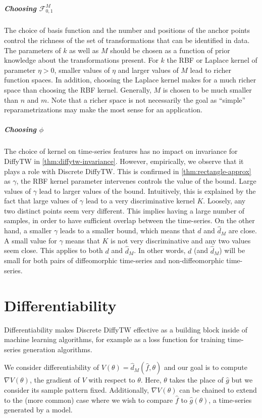 \subparagraph{Choosing $\mathcal F_{0,1}^M$} The choice of basis function and the number and positions of the anchor points control the richness of the set of transformations that can be identified in data. The parameters of $k$ as well as $M$ should be chosen as a function of prior knowledge about the transformations present. For $k$ the RBF or Laplace kernel of parameter $\eta>0$, smaller values of $\eta$ and larger values of $M$ lead to richer function spaces. In addition, choosing the Laplace kernel makes for a much richer space than choosing the RBF kernel\cite{shawe-taylor}. Generally, $M$ is chosen to be much smaller than $n$ and $m$. Note that a richer space is not necessarily the goal as ``simple'' reparametrizations may make the most sense for an application.

\subparagraph{Choosing $\phi$} The choice of kernel on time-series features has no impact on invariance for DiffyTW in \cref{thm:diffytw-invariance}. However, empirically, we observe that it plays a role with Discrete DiffyTW. This is confirmed in \cref{thm:rectangle-approx} as $\gamma$, the RBF kernel parameter intervenes controls the value of the bound. Large values of $\gamma$ lead to larger values of the bound. Intuitively, this is explained by the fact that large values of $\gamma$ lead to a very discriminative kernel $K$. Loosely, any two distinct points seem very different. This implies having a large number of samples, in order to have sufficient overlap between the time-series. On the other hand, a smaller $\gamma$ leads to a smaller bound, which means that $d$ and $\hat d_M$ are close. A small value for $\gamma$ means that $K$ is not very discriminative and any two values seem close. This applies to both $d$ and $\hat d_M$. In other words, $d$ (and $\hat d_M$) will be small for both pairs of diffeomorphic time-series and non-diffeomorphic time-series.

\section{Differentiability}
Differentiability makes Discrete DiffyTW effective as a building block inside of machine learning algorithms, for example as a loss function for training time-series generation algorithms.

We consider differentiability of $V(\theta) = \hat d_M(\hat f, \theta)$ and our goal is to compute $\nabla V(\theta)$, the gradient of $V$ with respect to $\theta$. Here, $\theta$ takes the place of $\hat g$ but we consider its sample pattern fixed. Additionally, $\nabla V(\theta)$ can be chained to extend to the (more common) case where we wish to compare $\hat f$ to $\hat g(\theta)$, a time-series generated by a model.

